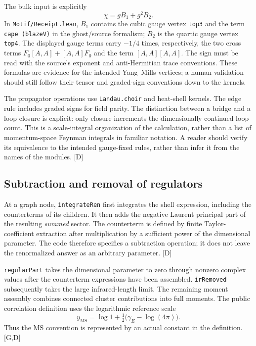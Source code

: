 \documentclass[11pt]{article}
\newcommand{\MS}{\overline{\mathrm{MS}}}
\newcommand{\code}[1]{{\small\nolinkurl{#1}}}
\newcommand{\src}[1]{\textsf{[#1]}}
\begin{document}
The bulk input is explicitly
\[
 \chi=g B_1+g^2B_2.
\]
In \code{Motif/Receipt.lean}, $B_1$ contains the cubic gauge vertex
\code{top3} and the term \code{cape (blazeV)} in the ghost/source
formalism; $B_2$ is the quartic gauge vertex \code{top4}. The displayed
gauge terms carry $-1/4$ times, respectively, the two cross terms
$F_0[A,A]+[A,A]F_0$ and the term $[A,A][A,A]$. The sign must be read with
the source's exponent and anti-Hermitian trace conventions. These
formulas are evidence for the intended Yang--Mills vertices; a human
validation should still follow their tensor and graded-sign conventions
down to the kernels.

The propagator operations use \code{Landau.choir} and heat-shell kernels.
The edge rule includes graded signs for field parity. The distinction
between a bridge and a loop closure is explicit: only closure increments
the dimensionally continued loop count. This is a scale-integral
organization of the calculation, rather than a list of momentum-space
Feynman integrals in familiar notation. A reader should verify its
equivalence to the intended gauge-fixed rules, rather than infer it from
the names of the modules. \src{D}

\subsection{Subtraction and removal of regulators}

At a graph node, \code{integrateRen} first integrates the shell expression,
including the counterterms of its children. It then adds the negative
Laurent principal part of the resulting \emph{summed} sector. The
counterterm is defined by finite Taylor-coefficient extraction after
multiplication by a sufficient power of the dimensional parameter.
The code therefore specifies a subtraction operation; it does not leave
the renormalized answer as an arbitrary parameter. \src{D}

\code{regularPart} takes the dimensional parameter to zero through
nonzero complex values after the counterterm expressions have been
assembled. \code{irRemoved} subsequently takes the large infrared-length
limit. The remaining moment assembly combines connected cluster
contributions into full moments. The public correlation definition
uses the logarithmic reference scale
\begin{equation}\label{eq:ms-scale}
 y_{\MS}=\log 1+\tfrac12\bigl(\gamma_E-\log(4\pi)\bigr).
\end{equation}
Thus the $\MS$ convention is represented by an actual constant in the
definition. \src{G,D}
\end{document}
